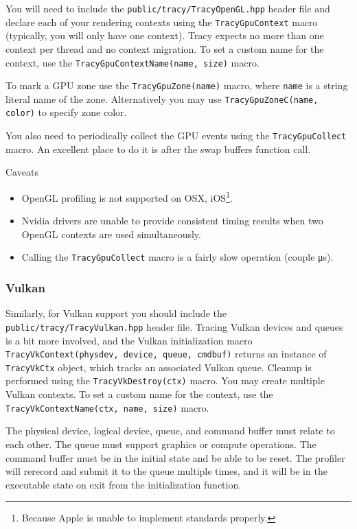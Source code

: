 \documentclass[hidelinks,titlepage,a4paper]{article}
\begin{document}
You will need to include the \texttt{public/tracy/TracyOpenGL.hpp} header file and declare each of your rendering contexts using the \texttt{TracyGpuContext} macro (typically, you will only have one context). Tracy expects no more than one context per thread and no context migration. To set a custom name for the context, use the \texttt{TracyGpuContextName(name, size)} macro.

To mark a GPU zone use the \texttt{TracyGpuZone(name)} macro, where \texttt{name} is a string literal name of the zone. Alternatively you may use \texttt{TracyGpuZoneC(name, color)} to specify zone color.

You also need to periodically collect the GPU events using the \texttt{TracyGpuCollect} macro. An excellent place to do it is after the swap buffers function call.

\begin{bclogo}[
noborder=true,
couleur=black!5,
logo=\bcattention
]{Caveats}
\begin{itemize}
\item OpenGL profiling is not supported on OSX, iOS\footnote{Because Apple is unable to implement standards properly.}.
\item Nvidia drivers are unable to provide consistent timing results when two OpenGL contexts are used simultaneously.
\item Calling the \texttt{TracyGpuCollect} macro is a fairly slow operation (couple \si{\micro\second}).
\end{itemize}
\end{bclogo}

\subsubsection{Vulkan}

Similarly, for Vulkan support you should include the \texttt{public/tracy/TracyVulkan.hpp} header file. Tracing Vulkan devices and queues is a bit more involved, and the Vulkan initialization macro \texttt{TracyVkContext(physdev, device, queue, cmdbuf)} returns an instance of \texttt{TracyVkCtx} object, which tracks an associated Vulkan queue. Cleanup is performed using the \texttt{TracyVkDestroy(ctx)} macro. You may create multiple Vulkan contexts. To set a custom name for the context, use the \texttt{TracyVkContextName(ctx, name, size)} macro.

The physical device, logical device, queue, and command buffer must relate to each other. The queue must support graphics or compute operations. The command buffer must be in the initial state and be able to be reset. The profiler will rerecord and submit it to the queue multiple times, and it will be in the executable state on exit from the initialization function.
\end{document}
